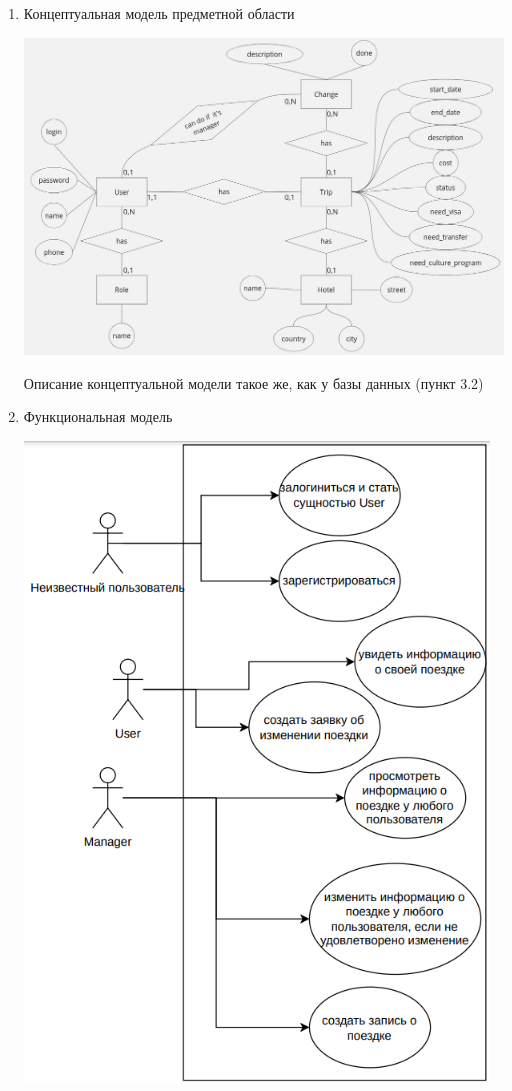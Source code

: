 \documentclass[a4paper,12pt]{article}
\begin{document}
\begin{enumerate}
    \item Концептуальная модель предметной области

          \includegraphics[width=\textwidth]{media/models/ER.jpg}

          Описание концептуальной модели такое же, как у базы данных (пункт 3.2)

    \item Функциональная модель

          \includegraphics[width=4.856262029746282in, height=6.687497812773404in]{media/models/f_model.png}


\end{enumerate}
\end{document}
